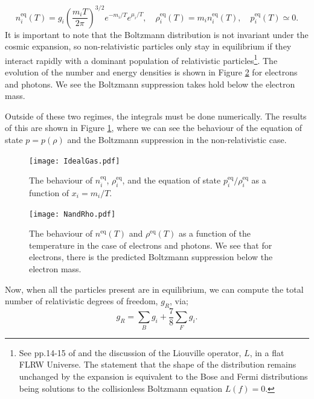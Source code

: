 \documentclass[11pt]{article}
\numberwithin{equation}{section}
\numberwithin{figure}{section}
\numberwithin{table}{section}
\begin{document}
\begin{enumerate}
\begin{equation}
n_i^{\mathrm{eq}}(T) = g_i\left(\frac{m_iT}{2\pi}\right)^{3/2} e^{-m_i/T}e^{\mu_i/T}, \quad \rho_i^{\mathrm{eq}}(T) = m_i n_i^{\mathrm{eq}}(T), \quad p_i^{\mathrm{eq}}(T) \simeq 0.
\end{equation}
It is important to note that the Boltzmann distribution is not invariant under the cosmic expansion, so non-relativistic particles only stay in equilibrium if they interact rapidly with a dominant population of relativistic particles\footnote{See pp.14-15 of \citet{Bernstein:1988bw} and the discussion of the Liouville operator, $L$, in a flat FLRW Universe. The statement that the shape of the distribution remains unchanged by the expansion is equivalent to the Bose and Fermi distributions being solutions to the collisionless Boltzmann equation $L(f) = 0$.}. The evolution of the number and energy densities is shown in Figure \ref{fig:nandrho} for electrons and photons. We see the Boltzmann suppression takes hold below the electron mass.
\end{enumerate}
Outside of these two regimes, the integrals must be done numerically. The results of this are shown in Figure \ref{fig:idealgas}, where we can see the behaviour of the equation of state $p = p(\rho)$ and the Boltzmann suppression in the non-relativistic case.
\begin{figure}[t]
\begin{center}
\texttt{[image: IdealGas.pdf]}
\caption{The behaviour of $n_i^{\mathrm{eq}}$, $\rho_i^{\mathrm{eq}}$, and the equation of state $p_i^{\mathrm{eq}}/\rho_i^{\mathrm{eq}}$ as a function of $x_i = m_i/T$.}\label{fig:idealgas}
\end{center}
\end{figure}
\begin{figure}[t]
\begin{center}
\texttt{[image: NandRho.pdf]}
\caption{The behaviour of $n^{\mathrm{eq}}(T)$ and $\rho^{\mathrm{eq}}(T)$ as a function of the temperature in the case of electrons and photons. We see that for electrons, there is the predicted Boltzmann suppression below the electron mass.}\label{fig:nandrho}
\end{center}
\end{figure}
Now, when all the particles present are in equilibrium, we can compute the total number of relativistic degrees of freedom, $g_R$, via;
\begin{equation}
g_R = \sum_{B}{g_i} + \frac{7}{8}\sum_{F}{g_i}.
\end{equation}
\end{document}
